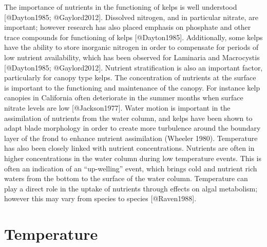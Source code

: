 \documentclass[]{article}
\begin{document}
The importance of nutrients in the functioning of kelps is well
understood {[}@Dayton1985; @Gaylord2012{]}. Dissolved nitrogen, and in
particular nitrate, are important; however research has also placed
emphasis on phosphate and other trace compounds for functioning of kelps
{[}@Dayton1985{]}. Additionally, some kelps have the ability to store
inorganic nitrogen in order to compensate for periods of low nutrient
availability, which has been observed for Laminaria and Macrocystis
{[}@Dayton1985; @Gaylord2012{]}. Nutrient stratiﬁcation is also an
important factor, particularly for canopy type kelps. The concentration
of nutrients at the surface is important to the functioning and
maintenance of the canopy. For instance kelp canopies in California
often deteriorate in the summer months when surface nitrate levels are
low {[}@Jackson1977{]}. Water motion is important in the assimilation of
nutrients from the water column, and kelps have been shown to adapt
blade morphology in order to create more turbulence around the boundary
layer of the frond to enhance nutrient assimilation (Wheeler 1980).
Temperature has also been closely linked with nutrient concentrations.
Nutrients are often in higher concentrations in the water column during
low temperature events. This is often an indication of an ``up-welling''
event, which brings cold and nutrient rich waters from the bottom to the
surface of the water column. Temperature can play a direct role in the
uptake of nutrients through eﬀects on algal metabolism; however this may
vary from species to species {[}@Raven1988{]}.

\section{Temperature}\label{temperature}
\end{document}
